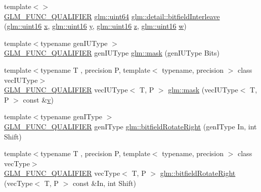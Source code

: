 \begin{DoxyCompactItemize}
\item 
{\footnotesize template$<$$>$ }\\\mbox{\hyperlink{setup_8hpp_a33fdea6f91c5f834105f7415e2a64407}{G\+L\+M\+\_\+\+F\+U\+N\+C\+\_\+\+Q\+U\+A\+L\+I\+F\+I\+ER}} \mbox{\hyperlink{group__gtc__type__precision_gae3632bf9b37da66233d78930dd06378a}{glm\+::uint64}} \mbox{\hyperlink{namespaceglm_1_1detail_a3ed141c5adbf2e1209ffe2081d98ba4c}{glm\+::detail\+::bitfield\+Interleave}} (\mbox{\hyperlink{group__gtc__type__precision_gad8c2939e1fdd8e5828b31d95c52255d5}{glm\+::uint16}} \mbox{\hyperlink{glad_8h_a92d0386e5c19fb81ea88c9f99644ab1d}{x}}, \mbox{\hyperlink{group__gtc__type__precision_gad8c2939e1fdd8e5828b31d95c52255d5}{glm\+::uint16}} \mbox{\hyperlink{glad_8h_a66ddd433d2cacfe27f5906b7e86faeed}{y}}, \mbox{\hyperlink{group__gtc__type__precision_gad8c2939e1fdd8e5828b31d95c52255d5}{glm\+::uint16}} \mbox{\hyperlink{glad_8h_acb78bf1972d3eaf07da34ff2e0a2f133}{z}}, \mbox{\hyperlink{group__gtc__type__precision_gad8c2939e1fdd8e5828b31d95c52255d5}{glm\+::uint16}} \mbox{\hyperlink{glad_8h_a1d0296e9e835f2e1ee17634af95fc1ec}{w}})
\item 
{\footnotesize template$<$typename gen\+I\+U\+Type $>$ }\\\mbox{\hyperlink{setup_8hpp_a33fdea6f91c5f834105f7415e2a64407}{G\+L\+M\+\_\+\+F\+U\+N\+C\+\_\+\+Q\+U\+A\+L\+I\+F\+I\+ER}} gen\+I\+U\+Type \mbox{\hyperlink{group__gtc__bitfield_gad7eba518a0b71662114571ee76939f8a}{glm\+::mask}} (gen\+I\+U\+Type Bits)
\item 
{\footnotesize template$<$typename T , precision P, template$<$ typename, precision $>$ class vec\+I\+U\+Type$>$ }\\\mbox{\hyperlink{setup_8hpp_a33fdea6f91c5f834105f7415e2a64407}{G\+L\+M\+\_\+\+F\+U\+N\+C\+\_\+\+Q\+U\+A\+L\+I\+F\+I\+ER}} vec\+I\+U\+Type$<$ T, P $>$ \mbox{\hyperlink{group__gtc__bitfield_ga073dbd8642f550b51da3572541431c1c}{glm\+::mask}} (vec\+I\+U\+Type$<$ T, P $>$ const \&\mbox{\hyperlink{glad_8h_a14cfbe2fc2234f5504618905b69d1e06}{v}})
\item 
{\footnotesize template$<$typename gen\+I\+Type $>$ }\\\mbox{\hyperlink{setup_8hpp_a33fdea6f91c5f834105f7415e2a64407}{G\+L\+M\+\_\+\+F\+U\+N\+C\+\_\+\+Q\+U\+A\+L\+I\+F\+I\+ER}} gen\+I\+Type \mbox{\hyperlink{namespaceglm_a29f065281c52cf3ca7695e71504687fc}{glm\+::bitfield\+Rotate\+Right}} (gen\+I\+Type In, int Shift)
\item 
{\footnotesize template$<$typename T , precision P, template$<$ typename, precision $>$ class vec\+Type$>$ }\\\mbox{\hyperlink{setup_8hpp_a33fdea6f91c5f834105f7415e2a64407}{G\+L\+M\+\_\+\+F\+U\+N\+C\+\_\+\+Q\+U\+A\+L\+I\+F\+I\+ER}} vec\+Type$<$ T, P $>$ \mbox{\hyperlink{group__gtc__bitfield_ga96b56fd2adad1eeaee9e10dfe83904ba}{glm\+::bitfield\+Rotate\+Right}} (vec\+Type$<$ T, P $>$ const \&In, int Shift)

\end{DoxyCompactItemize}
